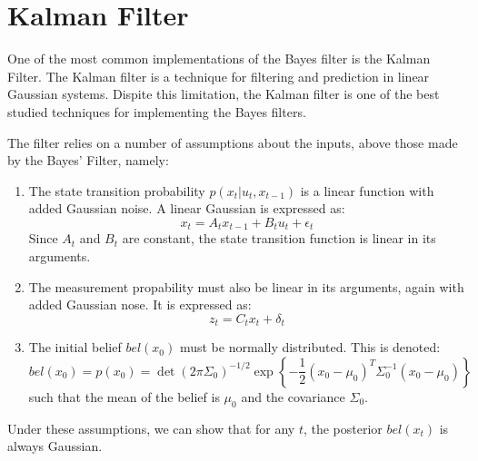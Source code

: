 \documentclass[english]{article}
\begin{document}
 




\section*{Kalman Filter}

One of the most common implementations of the Bayes filter is the Kalman Filter. The Kalman filter is a technique for filtering and prediction in linear Gaussian systems. Dispite this limitation, the Kalman filter is one of the best studied techniques for implementing the Bayes filters.

The filter relies on a number of assumptions about the inputs, above those made by the Bayes' Filter, namely:
\begin{enumerate}
	\item The state transition probability $p(x_t | u_t,x_{t-1})$ is a linear function with added Gaussian noise. A linear Gaussian is expressed as:
		\begin{equation}
			x_t = A_t x_{t-1} + B_t u_t + \epsilon _t
		\end{equation}
		Since $A_t$ and $B_t$ are constant, the state transition function is linear in its arguments.
	\item The measurement propability must also be linear in its arguments, again with added Gaussian nose. It is expressed as:
		\begin{equation}
			z_t = C_t x_t + \delta _t
		\end{equation}
	\item The initial belief $bel(x_0)$ must be normally distributed. This is denoted:
		\begin{equation}
			bel(x_0) = p(x_0) = \det(2 \pi \Sigma_0)^{-1/2} \exp\left\{-\frac{1}{2}(x_0-\mu_0)^T \Sigma_0^{-1}(x_0-\mu_0)\right\}
		\end{equation}
		such that the mean of the belief is $\mu_0$ and the covariance $\Sigma_0$.
\end{enumerate}
Under these assumptions, we can show that for any $t$, the posterior $bel(x_t)$ is always Gaussian.
\end{document}
